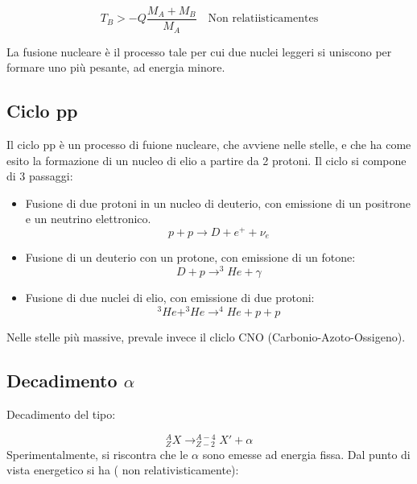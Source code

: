 \documentclass{article}
\begin{document}
\begin{equation}
    T_B>-Q\frac{M_A+M_B}{M_A} \quad \text{Non relatiisticamentes}
\end{equation}

La fusione nucleare è il processo tale per cui due nuclei leggeri si uniscono per formare uno più pesante, ad energia minore.

\subsection{Ciclo pp}
Il ciclo pp è un processo di fuione nucleare, che avviene nelle stelle, e che ha come esito la formazione di un nucleo di elio a partire da 2 protoni.
Il ciclo si compone di 3 passaggi:

\begin{itemize}
    \item Fusione di due protoni in un nucleo di deuterio, con emissione di un positrone e un neutrino elettronico.
          \begin{equation}
              p+p\rightarrow D+e^++\nu_e
          \end{equation}
    \item Fusione di un deuterio con un protone, con emissione di un fotone:
          \begin{equation}
              D+p\rightarrow ^3He+\gamma
          \end{equation}
    \item Fusione di due nuclei di elio, con emissione di due protoni:
          \begin{equation}
              ^3He+^3He\rightarrow ^4He+p+p
          \end{equation}
\end{itemize}

Nelle stelle più massive, prevale invece il cliclo CNO (Carbonio-Azoto-Ossigeno).

\subsection{Decadimento $\alpha$}

Decadimento del tipo:

\begin{equation}
    ^A_ZX\rightarrow ^{A-4}_{Z-2}X'+\alpha
\end{equation}
Sperimentalmente, si riscontra che le $\alpha$ sono emesse ad energia fissa.
Dal punto di vista energetico si ha ( non relativisticamente):
\end{document}
